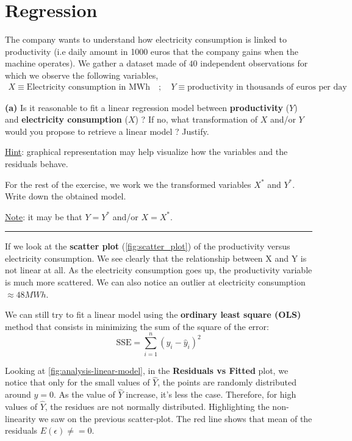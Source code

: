 \section{Regression}

The company wants to understand how electricity consumption is linked to productivity (i.e daily amount in 1000 euros that the company gains when the machine operates). We gather a dataset made of $40$ independent observations for which we observe the following variables,
\begin{equation}
  \begin{array}{rl}
    X \equiv \text{Electricity consumption in MWh} \quad ; \quad Y \equiv \text{productivity in thousands of euros per day}
  \end{array}
\end{equation}

\textbf{(a)} Is it reasonable to fit a linear regression model between \textbf{productivity} ($Y$) and \textbf{electricity consumption} ($X$) ? 
If no, what transformation of $X$ and/or $Y$ would you propose to retrieve a linear model ? Justify.

\underline{Hint}: graphical representation may help visualize how the variables and the residuals behave.

For the rest of the exercise, we work we the transformed variables $X^{\ast}$ and $Y^{\ast}$. 
Write down the obtained model.

\underline{Note}: it may be that $Y = Y^{\ast}$ and/or $X = X^{\ast}$.

\begin{center}\rule{6cm}{0.4pt}\end{center}

If we look at the \textbf{scatter plot} (\ref{fig:scatter_plot}) of the productivity versus electricity consumption. We see clearly that the relationship between X and Y is not linear at all. As the electricity consumption goes up, the productivity variable is much more scattered. We can also notice an outlier at electricity consumption $\approx 48MWh$.

We can still try to fit a linear model using the \textbf{ordinary least square (OLS)} method that consists in minimizing the sum of the square of the error: 
\begin{equation}
  \text{SSE} = \sum_{i = 1}^{n} (y_i - \hat{y}_i)^2
\end{equation}

Looking at \autoref{fig:analysis-linear-model}, in the \textbf{Residuals vs Fitted} plot, we notice that only for the small values of $\hat{Y}$, the points are randomly distributed around $y = 0$. As the value of $\hat{Y}$ increase, it's less the case. Therefore, for high values of $\hat{Y}$, the residues are not normally distributed. Highlighting the non-linearity we saw on the previous scatter-plot. The red line shows that mean of the residuals $E(\epsilon) \neq = 0$.


